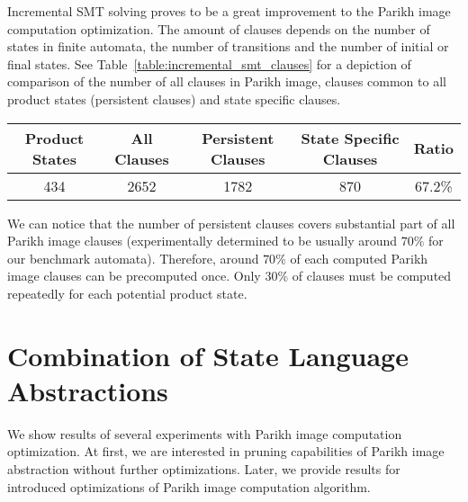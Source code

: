Incremental SMT solving proves to be a great improvement to the Parikh image computation optimization. The amount of clauses depends on the number of states in finite automata, the number of transitions and the number of initial or final states. See Table~\ref{table:incremental_smt_clauses} for a depiction of comparison of the number of all clauses in Parikh image, clauses common to all product states (persistent clauses) and state specific clauses.

\begin{table*}[ht]
	\centering
    \begin{tabular}{ |c|c|c|c|c| }
        \hline
        Product States & All Clauses & Persistent Clauses & State Specific Clauses & Ratio \\ \hline
        434 & 2652 & 1782 & 870 & 67.2\% \\ \hline
    \end{tabular}
    \caption{An example proportion of persistent and state specific clauses in Parikh image computation with incremental SMT solving optimization. The \emph{Product States} column shows the number of product states in the whole intersection product, the \emph{All Clauses} column shows the number of clauses in each computed Parikh image, the \emph{Persistent Clauses} column shows the number of persistent clauses in the whole Parikh image (out of the all Parikh image clauses), \emph{State Specific Clauses} column states how many Parikh image clauses have to be recomputed for each product state and \emph{Ratio} column shows the ratio of persistent clauses in all Parikh image clauses.}
    \label{table:incremental_smt_clauses}
\end{table*}

We can notice that the number of persistent clauses covers substantial part of all Parikh image clauses (experimentally determined to be usually around $70 \%$ for our benchmark automata). Therefore, around $70\%$ of each computed Parikh image clauses can be precomputed once. Only $30\%$ of clauses must be computed repeatedly for each potential product state.

\section{Combination of State Language Abstractions}

We show results of several experiments with Parikh image computation optimization. At first, we are interested in pruning capabilities of Parikh image abstraction without further optimizations. Later, we provide results for introduced optimizations of Parikh image computation algorithm.

